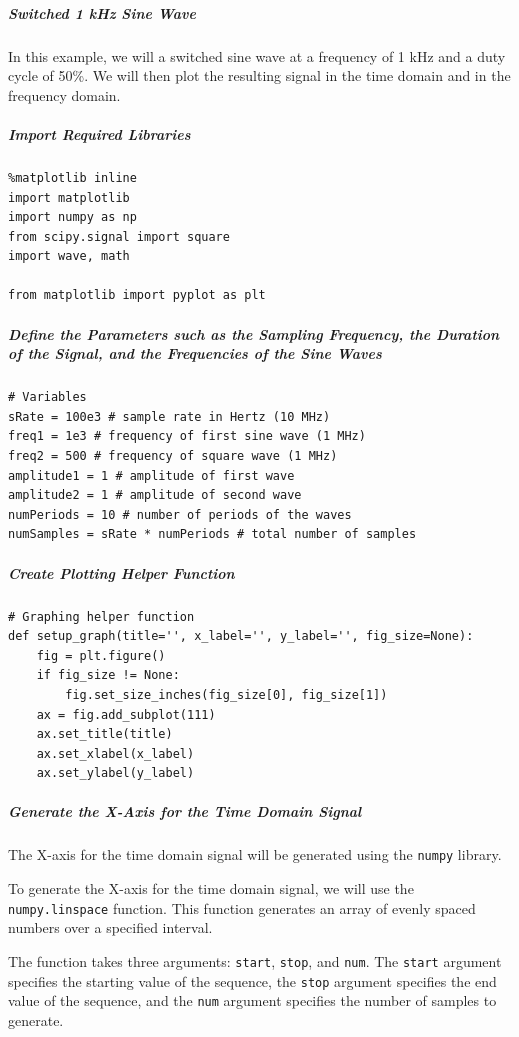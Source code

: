 \subparagraph{Switched 1 kHz Sine Wave}

In this example, we will a switched sine wave at a frequency of 1 kHz and a duty cycle of 50\%. We will then plot the resulting signal in the time domain and in the frequency domain.

\subparagraph{Import Required Libraries}

\begin{verbatim}
%matplotlib inline
import matplotlib
import numpy as np
from scipy.signal import square
import wave, math

from matplotlib import pyplot as plt
\end{verbatim}

\subparagraph{Define the Parameters such as the Sampling Frequency, the Duration of the Signal, and the Frequencies of the Sine Waves}

\begin{verbatim}
# Variables
sRate = 100e3 # sample rate in Hertz (10 MHz)
freq1 = 1e3 # frequency of first sine wave (1 MHz)
freq2 = 500 # frequency of square wave (1 MHz)
amplitude1 = 1 # amplitude of first wave
amplitude2 = 1 # amplitude of second wave
numPeriods = 10 # number of periods of the waves
numSamples = sRate * numPeriods # total number of samples
\end{verbatim}

\subparagraph{Create Plotting Helper Function}

\begin{verbatim}
# Graphing helper function
def setup_graph(title='', x_label='', y_label='', fig_size=None):
    fig = plt.figure()
    if fig_size != None:
        fig.set_size_inches(fig_size[0], fig_size[1])
    ax = fig.add_subplot(111)
    ax.set_title(title)
    ax.set_xlabel(x_label)
    ax.set_ylabel(y_label)
\end{verbatim}

\subparagraph{Generate the X-Axis for the Time Domain Signal}

The X-axis for the time domain signal will be generated using the \texttt{numpy} library.

To generate the X-axis for the time domain signal, we will use the \texttt{numpy.linspace} function. This function generates an array of evenly spaced numbers over a specified interval.

The function takes three arguments: \texttt{start}, \texttt{stop}, and \texttt{num}. The \texttt{start} argument specifies the starting value of the sequence, the \texttt{stop} argument specifies the end value of the sequence, and the \texttt{num} argument specifies the number of samples to generate.

